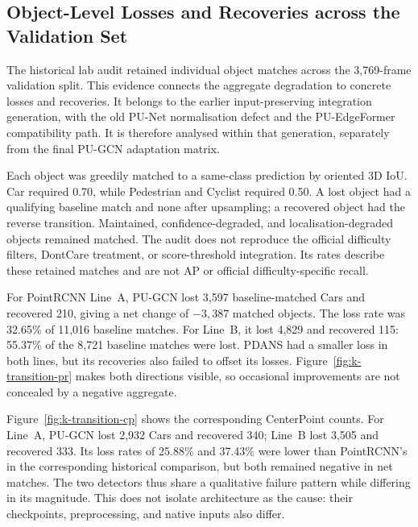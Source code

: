 \subsection{Object-Level Losses and Recoveries across the Validation Set}
\label{sec:kitti-transitions}

The historical lab audit retained individual object matches across the
3,769-frame validation split. This evidence connects the aggregate
degradation to concrete losses and recoveries. It belongs to the earlier
input-preserving integration generation, with the old PU-Net
normalisation defect and the PU-EdgeFormer compatibility path.
It is therefore analysed within that generation, separately from the
final PU-GCN adaptation matrix.

Each object was greedily matched to a same-class prediction by oriented
3D IoU. Car required 0.70, while Pedestrian and Cyclist required 0.50.
A lost object had a qualifying baseline match and none after upsampling;
a recovered object had the reverse transition. Maintained,
confidence-degraded, and localisation-degraded objects remained matched.
The audit does not reproduce the official difficulty filters, DontCare
treatment, or score-threshold integration. Its rates describe these
retained matches and are not AP or official difficulty-specific recall.

For PointRCNN Line~A, PU-GCN lost 3,597 baseline-matched Cars and recovered
210, giving a net change of $-3,387$ matched objects.
The loss rate was 32.65\% of 11,016 baseline matches.
For Line~B, it lost 4,829 and recovered 115: 55.37\% of the
8,721 baseline matches were lost. PDANS had a smaller loss in both
lines, but its recoveries also failed to offset its losses.
Figure~\ref{fig:k-transition-pr} makes both directions visible,
so occasional improvements are not concealed by a negative aggregate.


Figure~\ref{fig:k-transition-cp} shows the corresponding CenterPoint counts. For Line~A, PU-GCN lost 2,932 Cars and recovered 340;
Line~B lost 3,505 and recovered 333. Its loss rates of 25.88\% and
37.43\% were lower than PointRCNN's in the corresponding historical
comparison, but both remained negative in net matches.
The two detectors thus share a qualitative failure pattern while
differing in its magnitude. This does not isolate architecture as the
cause: their checkpoints, preprocessing, and native inputs also differ.

